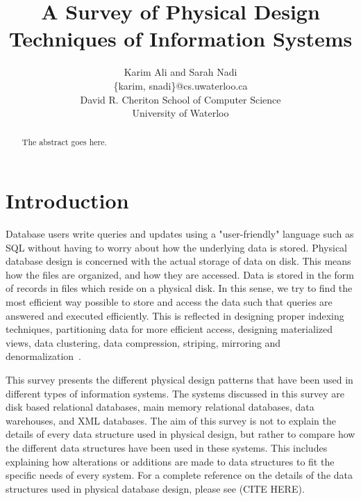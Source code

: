 \documentclass[12pt,a4paper]{article}
\begin{document}
%
\title{A Survey of Physical Design Techniques of Information Systems}



\author{Karim Ali and Sarah Nadi\\
\{karim, snadi\}@cs.uwaterloo.ca \\
David R. Cheriton School of Computer Science\\
University of Waterloo\\
}


\maketitle


\begin{abstract}
The abstract goes here.
\end{abstract}

\section{Introduction}

Database users write queries and updates using a "user-friendly" language such as SQL without having to worry about how the underlying data is stored. Physical
database design is concerned with the actual storage of data on disk. This means how the files are organized, and how they are accessed. Data is stored in the
form of records in files which reside on a physical disk. In this sense, we try to find the most efficient way possible to store and access the data such that
queries are answered and executed efficiently. This is reflected in designing proper indexing techniques, partitioning data for more efficient access, designing
materialized views, data clustering, data compression, striping, mirroring and denormalization~\cite{lightstone2007physical}. 


This survey presents the different physical design patterns that have been used in different types of information systems. The systems discussed in this survey
are disk based relational databases, main memory relational databases, data warehouses, and XML databases. The aim of this survey is not to explain the details
of every data structure used in physical design, but rather to compare how the different data structures have been used in these systems. This includes
explaining how alterations or additions are made to data structures to fit the specific needs of every system. For a complete reference on the details of the
data structures used in physical database design, please see (CITE HERE). 
\end{document}
